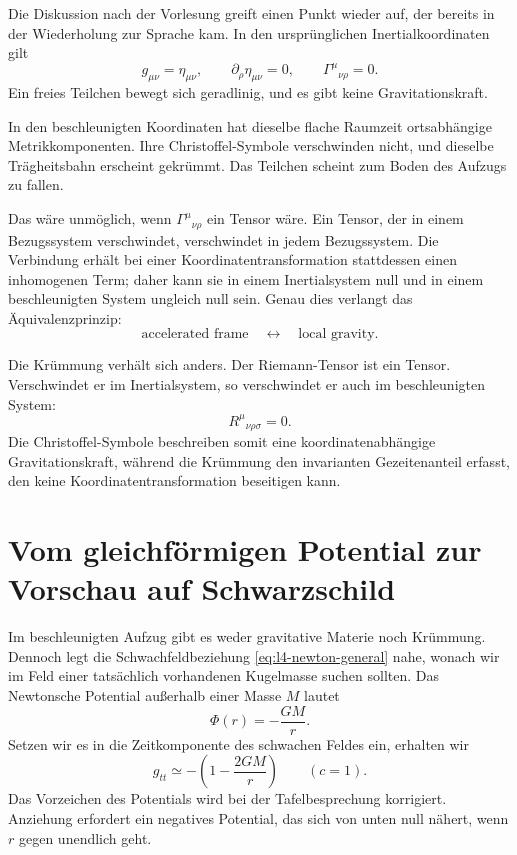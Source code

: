 Die Diskussion nach der Vorlesung greift einen Punkt wieder auf, der bereits in der Wiederholung zur Sprache kam. In den ursprünglichen Inertialkoordinaten gilt
\begin{equation}
g_{\mu\nu}=\eta_{\mu\nu},
\qquad
\partial_\rho\eta_{\mu\nu}=0,
\qquad
\Gamma^\mu{}_{\nu\rho}=0.
\end{equation}
Ein freies Teilchen bewegt sich geradlinig, und es gibt keine Gravitationskraft.

In den beschleunigten Koordinaten hat dieselbe flache Raumzeit ortsabhängige Metrikkomponenten. Ihre Christoffel-Symbole verschwinden nicht, und dieselbe Trägheitsbahn erscheint gekrümmt. Das Teilchen scheint zum Boden des Aufzugs zu fallen.

Das wäre unmöglich, wenn \(\Gamma^\mu{}_{\nu\rho}\) ein Tensor wäre. Ein Tensor, der in einem Bezugssystem verschwindet, verschwindet in jedem Bezugssystem. Die Verbindung erhält bei einer Koordinatentransformation stattdessen einen inhomogenen Term; daher kann sie in einem Inertialsystem null und in einem beschleunigten System ungleich null sein. Genau dies verlangt das Äquivalenzprinzip:
\begin{equation}
\text{accelerated frame}
\quad\longleftrightarrow\quad
\text{local gravity}.
\end{equation}

Die Krümmung verhält sich anders. Der Riemann-Tensor ist ein Tensor. Verschwindet er im Inertialsystem, so verschwindet er auch im beschleunigten System:
\begin{equation}
R^\mu{}_{\nu\rho\sigma}=0.
\end{equation}
Die Christoffel-Symbole beschreiben somit eine koordinatenabhängige Gravitationskraft, während die Krümmung den invarianten Gezeitenanteil erfasst, den keine Koordinatentransformation beseitigen kann.

\section{Vom gleichförmigen Potential zur Vorschau auf Schwarzschild}

Im beschleunigten Aufzug gibt es weder gravitative Materie noch Krümmung. Dennoch legt die Schwachfeldbeziehung \eqref{eq:l4-newton-general} nahe, wonach wir im Feld einer tatsächlich vorhandenen Kugelmasse suchen sollten. Das Newtonsche Potential außerhalb einer Masse \(M\) lautet
\begin{equation}
\Phi(r)=-\frac{GM}{r}.
\label{eq:l4-newton-potential}
\end{equation}
Setzen wir es in die Zeitkomponente des schwachen Feldes ein, erhalten wir
\begin{equation}
g_{tt}
\simeq
-\left(1-\frac{2GM}{r}\right)
\qquad(c=1).
\label{eq:l4-schwarzschild-preview}
\end{equation}
Das Vorzeichen des Potentials wird bei der Tafelbesprechung korrigiert. Anziehung erfordert ein negatives Potential, das sich von unten null nähert, wenn \(r\) gegen unendlich geht.

